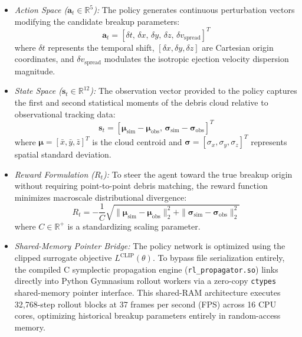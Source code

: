 \begin{itemize}
    \item \textit{Action Space ($\mathbf{a}_t \in \mathbb{R}^5$):} The policy generates continuous perturbation vectors modifying the candidate breakup parameters:
    \begin{equation}
    \mathbf{a}_t = [\delta t, \, \delta x, \, \delta y, \, \delta z, \, \delta v_{\text{spread}}]^T
    \label{eq:ppo_action}
    \end{equation}
    where $\delta t$ represents the temporal shift, $[\delta x, \delta y, \delta z]$ are Cartesian origin coordinates, and $\delta v_{\text{spread}}$ modulates the isotropic ejection velocity dispersion magnitude.
    \item \textit{State Space ($\mathbf{s}_t \in \mathbb{R}^{12}$):} The observation vector provided to the policy captures the first and second statistical moments of the debris cloud relative to observational tracking data:
    \begin{equation}
    \mathbf{s}_t = [\boldsymbol{\mu}_{\text{sim}} - \boldsymbol{\mu}_{\text{obs}}, \, \boldsymbol{\sigma}_{\text{sim}} - \boldsymbol{\sigma}_{\text{obs}}]^T
    \label{eq:ppo_state}
    \end{equation}
    where $\boldsymbol{\mu} = [\bar{x}, \bar{y}, \bar{z}]^T$ is the cloud centroid and $\boldsymbol{\sigma} = [\sigma_x, \sigma_y, \sigma_z]^T$ represents spatial standard deviation.
    \item \textit{Reward Formulation ($R_t$):} To steer the agent toward the true breakup origin without requiring point-to-point debris matching, the reward function minimizes macroscale distributional divergence:
    \begin{equation}
    R_t = -\frac{1}{C} \sqrt{ \|\boldsymbol{\mu}_{\text{sim}} - \boldsymbol{\mu}_{\text{obs}}\|_2^2 + \|\boldsymbol{\sigma}_{\text{sim}} - \boldsymbol{\sigma}_{\text{obs}}\|_2^2 }
    \label{eq:ppo_reward}
    \end{equation}
    where $C \in \mathbb{R}^+$ is a standardizing scaling parameter.
    \item \textit{Shared-Memory Pointer Bridge:} The policy network is optimized using the clipped surrogate objective $L^{\text{CLIP}}(\theta)$. To bypass file serialization entirely, the compiled C symplectic propagation engine (\texttt{rl\_propagator.so}) links directly into Python Gymnasium rollout workers via a zero-copy \texttt{ctypes} shared-memory pointer interface. This shared-RAM architecture executes 32,768-step rollout blocks at 37 frames per second (FPS) across 16 CPU cores, optimizing historical breakup parameters entirely in random-access memory.
\end{itemize}


